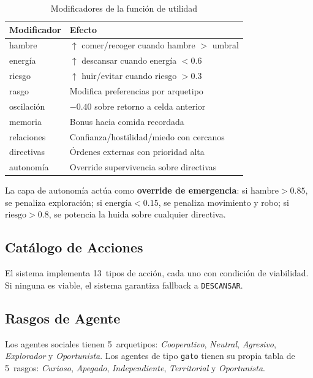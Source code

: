 \documentclass[11pt,a4paper,twocolumn]{article}
\begin{document}
\begin{table}[h]
  \centering
  \caption{Modificadores de la funci\'on de utilidad}
  \label{tab:modificadores}
  \small
  \begin{tabular}{p{1.4cm}p{3.6cm}}
    \toprule
    \textbf{Modificador} & \textbf{Efecto} \\
    \midrule
    hambre    & $\uparrow$ comer/recoger cuando hambre $>$ umbral \\
    energ\'ia & $\uparrow$ descansar cuando energ\'ia $<0.6$ \\
    riesgo    & $\uparrow$ huir/evitar cuando riesgo $>0.3$ \\
    rasgo     & Modifica preferencias por arquetipo \\
    oscilaci\'on & $-0.40$ sobre retorno a celda anterior \\
    memoria   & Bonus hacia comida recordada \\
    relaciones & Confianza/hostilidad/miedo con cercanos \\
    directivas & \'Ordenes externas con prioridad alta \\
    autonom\'ia & Override supervivencia sobre directivas \\
    \bottomrule
  \end{tabular}
\end{table}

La capa de autonom\'ia act\'ua como \textbf{override de emergencia}:
si $\text{hambre}>0.85$, se penaliza exploraci\'on; si
$\text{energ\'ia}<0.15$, se penaliza movimiento y robo; si
$\text{riesgo}>0.8$, se potencia la huida sobre cualquier directiva.

\subsection{Cat\'alogo de Acciones}

El sistema implementa 13~tipos de acci\'on, cada uno con condici\'on de
viabilidad. Si ninguna es viable, el sistema garantiza fallback a
\texttt{DESCANSAR}.

\subsection{Rasgos de Agente}

Los agentes sociales tienen 5~arquetipos: \textit{Cooperativo},
\textit{Neutral}, \textit{Agresivo}, \textit{Explorador} y
\textit{Oportunista}.
Los agentes de tipo \texttt{gato} tienen su propia tabla de 5~rasgos:
\textit{Curioso}, \textit{Apegado}, \textit{Independiente},
\textit{Territorial} y \textit{Oportunista}.
\end{document}
